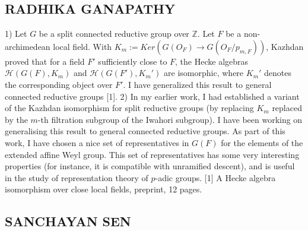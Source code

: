 \subsection{RADHIKA GANAPATHY}

1) Let $G$ be a split connected reductive group over $\mathbb{Z}$. Let $F$ be a non-archimedean local field. With $K_m := Ker(G(O_F ) → G(O_F /p_{m,F} ))$, Kazhdan proved that for a field $F′$ sufficiently close to $F$, the Hecke algebras $\mathcal{H}(G(F), K_m)$ and $\mathcal{H}(G(F′), K_m′ )$ are isomorphic, where $K_m′$ denotes the corresponding object over $F′$. I have generalized this result to general connected reductive groups [1].  2) In my earlier work, I had established  a variant of the Kazhdan isomorphism for split reductive groups (by replacing $K_m$ replaced by the $m$-th filtration subgroup of the Iwahori subgroup). I have been working on generalising this result to general connected reductive groups. As part of this work, I have chosen a nice set of representatives in $G(F)$ for the elements of the extended affine Weyl group. This set of representatives has some very interesting properties (for instance, it is compatible with unramified descent), and is useful in the study of representation theory of $p$-adic groups.   [1] A Hecke algebra isomorphism over close local fields, preprint, 12 pages.


\subsection{SANCHAYAN SEN}

